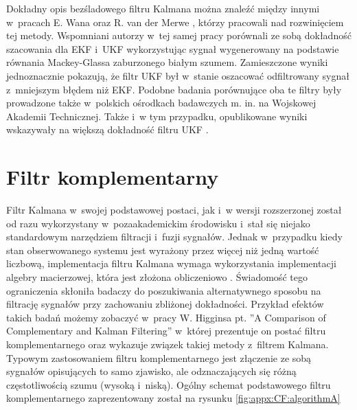 
Dokładny opis bezśladowego filtru Kalmana można znaleźć między innymi w~pracach E. Wana oraz R. van der Merwe \cite{Wan2000, Wan2001}, którzy pracowali nad rozwinięciem tej metody. Wspomniani autorzy w~tej samej pracy porównali ze sobą dokładność szacowania dla EKF i~UKF wykorzystując sygnał wygenerowany na podstawie równania Mackey-Glassa \cite{Glass2010} zaburzonego białym szumem. Zamieszczone wyniki jednoznacznie pokazują, że filtr UKF był w~stanie oszacować odfiltrowany sygnał z~mniejszym błędem niż EKF. Podobne badania porównujące oba te filtry były prowadzone także w~polskich ośrodkach badawczych m. in. na Wojskowej Akademii Technicznej. Także i~w tym przypadku, opublikowane wyniki wskazywały na większą dokładność filtru UKF \cite{Konatowski2007, Konatowski2007a}.

\section*{Filtr komplementarny}\label{sec:appx:filters:CF}
Filtr Kalmana w~swojej podstawowej postaci, jak i~w wersji rozszerzonej został od razu wykorzystany w~pozaakademickim środowisku i~stał się niejako standardowym narzędziem filtracji i~fuzji sygnałów. Jednak w~przypadku kiedy stan obserwowanego systemu jest wyrażony przez więcej niż jedną wartość liczbową, implementacja filtru Kalmana wymaga wykorzystania implementacji algebry macierzowej, która jest złożona obliczeniowo \cite{wiki:MatrixAlgebraComplexity2016}. Świadomość tego ograniczenia skłoniła badaczy do poszukiwania alternatywnego sposobu na filtrację sygnałów przy zachowaniu zbliżonej dokładności. Przykład efektów takich badań możemy zobaczyć w~pracy W. Higginsa pt. ''A Comparison of Complementary and Kalman Filtering'' \cite{Higgins1975} w~której prezentuje on postać filtru komplementarnego oraz wykazuje związek takiej metody z~filtrem Kalmana. Typowym zastosowaniem filtru komplementarnego jest złączenie ze sobą sygnałów opisujących to samo zjawisko, ale odznaczających się różną częstotliwością szumu (wysoką i~niską). Ogólny schemat podstawowego filtru komplementarnego zaprezentowany został na rysunku \ref{fig:appx:CF:algorithmA}

